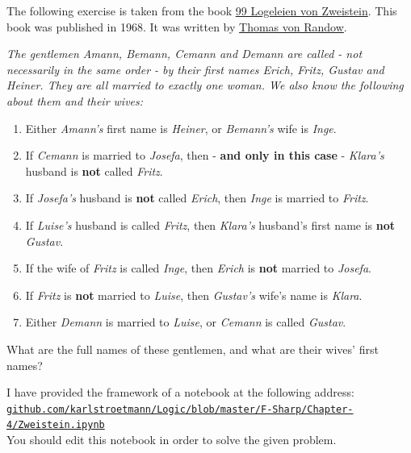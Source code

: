 \exerciseEng
The following exercise is taken from the book 
\href{https://www.amazon.de/Logeleien-Zweistein-ihren-Antworten-Wegner/dp/B006YF0VUE}{99 Logeleien von Zweistein}.
This book was published in 1968.  It was written by 
\href{http://de.wikipedia.org/wiki/Thomas_von_Randow}{Thomas von Randow}.

\begin{minipage}{0.95\linewidth}
  {\sl
    The gentlemen \emph{Amann}, \emph{Bemann}, \emph{Cemann} and \emph{Demann} are called - not
    necessarily in the same order - by their 
    first names \emph{Erich}, \emph{Fritz}, \emph{Gustav} and \emph{Heiner}. They are all married to
    exactly one woman. We also know the following about them and their wives: 
    \begin{enumerate}
    \item Either \emph{Amann's} first name is \emph{Heiner}, or \emph{Bemann's} wife is \emph{Inge}.
    \item If \emph{Cemann} is married to \emph{Josefa}, then - \textbf{and only in this case} -
          \emph{Klara's} husband is \textbf{not} called \emph{Fritz}.
    \item If \emph{Josefa's} husband is \textbf{not} called \emph{Erich}, then \emph{Inge} is married to
          \emph{Fritz}. 
    \item If \emph{Luise's} husband is called \emph{Fritz}, then \emph{Klara's} husband's first name is
          \textbf{not} \emph{Gustav}. 
    \item If the wife of \emph{Fritz} is called \emph{Inge}, then \emph{Erich} is \textbf{not} married to
          \emph{Josefa}. 
    \item If \emph{Fritz} is \textbf{not} married to \emph{Luise}, then \emph{Gustav's} wife's name is \emph{Klara}.
    \item Either \emph{Demann} is married to \emph{Luise}, or \emph{Cemann} is called \emph{Gustav}.
    \end{enumerate}
    What are the full names of these gentlemen, and what are their wives' first names?}
\end{minipage}
\vspace*{0.3cm}

\noindent
I have provided the framework of a notebook at the following address:
\\[0.2cm]
\hspace*{1.3cm}
\href{https://github.com/karlstroetmann/Logic/blob/master/F-Sharp/Chapter-4/Zweistein.ipynb}{\texttt{github.com/karlstroetmann/Logic/blob/master/F-Sharp/Chapter-4/Zweistein.ipynb}}
\\[0.2cm]
You should edit this notebook in order to solve the given problem.

